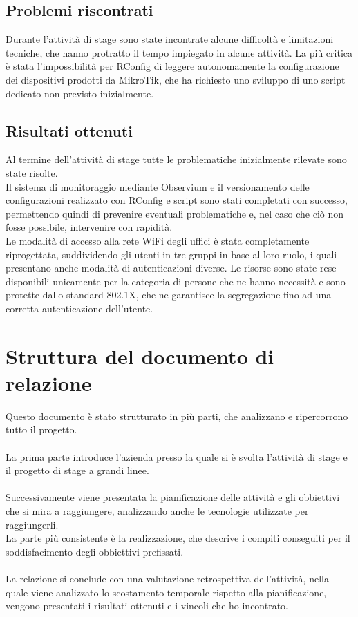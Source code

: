 \documentclass[Tesi.tex]{subfiles}
\begin{document}
\subsection{Problemi riscontrati}
Durante l'attività di stage sono state incontrate alcune difficoltà e limitazioni tecniche, che hanno protratto il tempo impiegato in alcune attività. La più critica è stata l'impossibilità per RConfig di leggere autonomamente la configurazione dei dispositivi prodotti da MikroTik, che ha richiesto uno sviluppo di uno script dedicato non previsto inizialmente.

\subsection{Risultati ottenuti}
Al termine dell'attività di stage tutte le problematiche inizialmente rilevate sono state risolte. \\
Il sistema di monitoraggio mediante Observium e il versionamento delle configurazioni realizzato con RConfig e script sono stati completati con successo, permettendo quindi di prevenire eventuali problematiche e, nel caso che ciò non fosse possibile, intervenire con rapidità.\\
Le modalità di accesso alla rete WiFi degli uffici è stata completamente riprogettata, suddividendo gli utenti in tre gruppi in base al loro ruolo, i quali presentano anche modalità di autenticazioni diverse. Le risorse sono state rese disponibili unicamente per la categoria di persone che ne hanno necessità e sono protette dallo standard 802.1X, che ne garantisce la segregazione fino ad una corretta autenticazione dell'utente.

\section{Struttura del documento di relazione}
Questo documento è stato strutturato in più parti, che analizzano e ripercorrono tutto il progetto.\\\\
La prima parte introduce l'azienda presso la quale si è svolta l'attività di stage e il progetto di stage a grandi linee. \\\\
Successivamente viene presentata la pianificazione delle attività e gli obbiettivi che si mira a raggiungere, analizzando anche le tecnologie utilizzate per raggiungerli. \\
La parte più consistente è la realizzazione, che descrive i compiti conseguiti per il soddisfacimento degli obbiettivi prefissati. \\\\
La relazione si conclude con una valutazione retrospettiva dell'attività, nella quale viene analizzato lo scostamento temporale rispetto alla pianificazione, vengono presentati i risultati ottenuti e i vincoli che ho incontrato.
\end{document}
